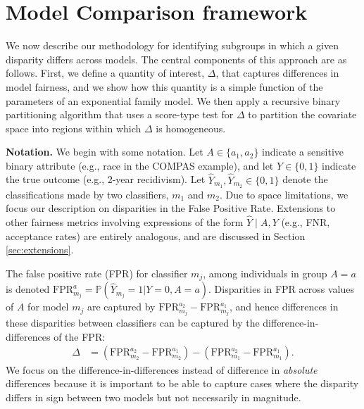 \documentclass[11pt, sigconf, svgnames]{acmart}
\renewcommand{\P}{\mathbb{P}}
\begin{document}
\section{Model Comparison framework}\label{sec:method}


We now describe our methodology for identifying subgroups in which a given
disparity differs across models.  The central components of this approach are as follows.  First, we define a quantity of interest, $\Delta$, that captures differences in model fairness, and we show how this quantity is a simple function of the parameters of an exponential family model.  We then apply a recursive binary partitioning algorithm that uses a score-type test for $\Delta$ to partition the covariate space into regions within which $\Delta$ is homogeneous.
%

\vspace{0.25em}

\noindent \textbf{Notation.}  We begin with some notation.
Let $A\in\{a_1,a_2\}$ indicate a sensitive binary attribute (e.g., race in the
COMPAS example), and let
$Y \in \{0,1\}$ indicate the true outcome (e.g., 2-year recidivism).  Let
$\hat{Y}_{m_1}, \hat{Y}_{m_2}\in\{0,1\}$ denote the classifications made by two
classifiers, $m_1$ and $m_2$.  Due to space limitations, we focus our
description on disparities in the False Positive Rate.  Extensions to other
fairness metrics involving expressions of the form $\hat Y \mid A, Y$ (e.g., FNR, acceptance rates) are entirely analogous, and are discussed in Section \ref{sec:extensions}.  

The false
positive rate (FPR) for classifier $m_j$, among individuals in group $A=a$ is
denoted
$\mathrm{FPR}_{m_j}^a = \P(\hat{Y}_{m_j}=1|Y=0, A=a)$.  Disparities in FPR across
values of $A$ for model $m_j$ are captured by $\mathrm{FPR}_{m_j}^{a_2} -
\mathrm{FPR}_{m_j}^{a_1}$, and hence differences in these disparities between
classifiers can be captured by the difference-in-differences of the FPR:
%
\begin{align}
  \Delta &= \left(\mathrm{FPR}_{m_2}^{a_2} - \mathrm{FPR}_{m_2}^{a_1}\right) -
  \left(\mathrm{FPR}_{m_1}^{a_2} - \mathrm{FPR}_{m_1}^{a_1}\right).
  \label{eq:delta}
\end{align}
We focus on the difference-in-differences instead of difference in \emph{absolute} differences because it is important to be able to capture cases where the disparity differs in sign between two models but not necessarily in magnitude.  
\end{document}
